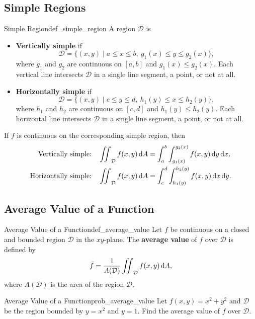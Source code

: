 \subsection{Simple Regions}
\begin{definition}{Simple Region}{def_simple_region}
A region $\mathcal{D}$ is
\begin{itemize}
    \item \textbf{Vertically simple} if
    \[\mathcal{D} = \{(x, y) \mid a \leq x \leq b,\ g_1(x) \leq y \leq g_2(x)\},\]
    where $g_1$ and $g_2$ are continuous on $[a, b]$ and $g_1(x) \leq g_2(x)$.
    Each vertical line intersects $\mathcal{D}$ in a single line segment, a point, or not at all.

    \item \textbf{Horizontally simple} if
    \[\mathcal{D} = \{(x, y) \mid c \leq y \leq d,\ h_1(y) \leq x \leq h_2(y)\},\]
    where $h_1$ and $h_2$ are continuous on $[c, d]$ and $h_1(y) \leq h_2(y)$.
    Each horizontal line intersects $\mathcal{D}$ in a single line segment, a point, or not at all.
\end{itemize}
\end{definition}

If $f$ is continuous on the corresponding simple region, then
\begin{align*}
    \text{Vertically simple:}\quad
    \mathop{\int\mkern-10mu\int}\nolimits_{\mathcal{D}} f(x, y) \, \mathrm{d}A &= \int_a^b \int_{g_1(x)}^{g_2(x)} f(x, y) \, \mathrm{d}y \, \mathrm{d}x, \\
    \text{Horizontally simple:}\quad
    \mathop{\int\mkern-10mu\int}\nolimits_{\mathcal{D}} f(x, y) \, \mathrm{d}A &= \int_c^d \int_{h_1(y)}^{h_2(y)} f(x, y) \, \mathrm{d}x \, \mathrm{d}y.
\end{align*}

\subsection{Average Value of a Function}
\begin{definition}{Average Value of a Function}{def_average_value}
Let $f$ be continuous on a closed and bounded region $\mathcal{D}$ in the $xy$-plane.
The \textbf{average value} of $f$ over $\mathcal{D}$ is defined by
\[
    \bar{f} = \frac{1}{A(\mathcal{D})} \mathop{\int\mkern-10mu\int}\nolimits_{\mathcal{D}} f(x, y) \, \mathrm{d}A,
\]
where $A(\mathcal{D})$ is the area of the region $\mathcal{D}$.
\end{definition}

\begin{problem}{Average Value of a Function}{prob_average_value}
Let $f(x, y) = x^2 + y^2$ and $\mathcal{D}$ be the region bounded by $y = x^2$ and $y = 1$.
Find the average value of $f$ over $\mathcal{D}$. 
\end{problem}

